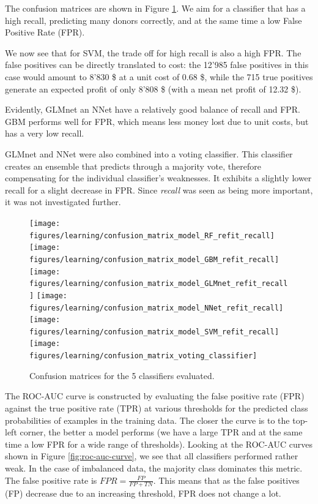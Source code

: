 \documentclass[
  11pt,
  a4paper,
  DIV=12,captions=tableheading,oneside,titlepage]{scrbook}
\begin{document}
The confusion matrices are shown in Figure \ref{fig:conf-matrices}. We aim for a classifier that has a high recall, predicting many donors correctly, and at the same time a low False Positive Rate (FPR).

We now see that for SVM, the trade off for high recall is also a high FPR. The false positives can be directly translated to cost: the 12'985 false positives in this case would amount to 8'830 \$ at a unit cost of 0.68 \$, while the 715 true positives generate an expected profit of only 8'808 \$ (with a mean net profit of 12.32 \$).

Evidently, GLMnet an NNet have a relatively good balance of recall and FPR. GBM performs well for FPR, which means less money lost due to unit costs, but has a very low recall.

GLMnet and NNet were also combined into a voting classifier. This classifier creates an ensemble that predicts through a majority vote, therefore compensating for the individual classifier's weaknesses. It exhibits a slightly lower recall for a slight decrease in FPR. Since \emph{recall} was seen as being more important, it was not investigated further.



\begin{figure}

{\centering \texttt{[image: figures/learning/confusion\_matrix\_model\_RF\_refit\_recall]} \texttt{[image: figures/learning/confusion\_matrix\_model\_GBM\_refit\_recall]} \texttt{[image: figures/learning/confusion\_matrix\_model\_GLMnet\_refit\_recall]} \texttt{[image: figures/learning/confusion\_matrix\_model\_NNet\_refit\_recall]} \texttt{[image: figures/learning/confusion\_matrix\_model\_SVM\_refit\_recall]} \texttt{[image: figures/learning/confusion\_matrix\_voting\_classifier]} 

}

\caption{Confusion matrices for the 5 classifiers evaluated.}\label{fig:conf-matrices}
\end{figure}

The ROC-AUC curve is constructed by evaluating the false positive rate (FPR) against the true positive rate (TPR) at various thresholds for the predicted class probabilities of examples in the training data. The closer the curve is to the top-left corner, the better a model performs (we have a large TPR and at the same time a low FPR for a wide range of thresholds). Looking at the ROC-AUC curves shown in Figure \ref{fig:roc-auc-curve}, we see that all classifiers performed rather weak. In the case of imbalanced data, the majority class dominates this metric. The false positive rate is \(FPR = \frac{FP}{FP+TN}\). This means that as the false positives (FP) decrease due to an increasing threshold, FPR does not change a lot.
\end{document}
